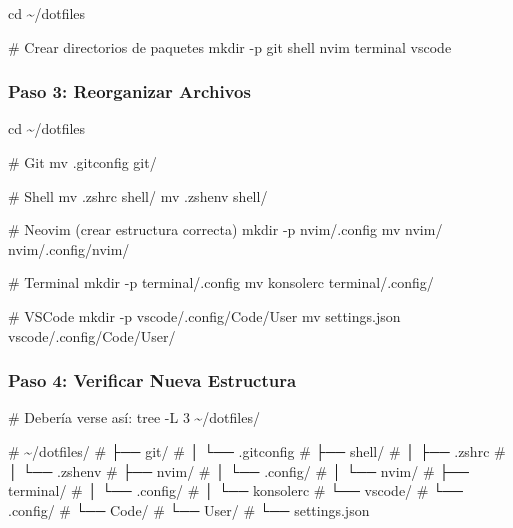 \documentclass[
  doc,
  floatsintext,
  longtable,
  a4paper,
  nolmodern,
  notxfonts,
  notimes,
  12pt,
  colorlinks=true,linkcolor=blue,citecolor=blue,urlcolor=blue]{apa7}
\newenvironment{Shaded}{\begin{snugshade}}{\end{snugshade}}
\newcommand{\AttributeTok}[1]{\textcolor[rgb]{0.40,0.45,0.13}{#1}}
\newcommand{\BuiltInTok}[1]{\textcolor[rgb]{0.00,0.23,0.31}{#1}}
\newcommand{\CommentTok}[1]{\textcolor[rgb]{0.37,0.37,0.37}{#1}}
\newcommand{\ExtensionTok}[1]{\textcolor[rgb]{0.00,0.23,0.31}{#1}}
\newcommand{\FunctionTok}[1]{\textcolor[rgb]{0.28,0.35,0.67}{#1}}
\newcommand{\NormalTok}[1]{\textcolor[rgb]{0.00,0.23,0.31}{#1}}
\begin{document}
\begin{Shaded}
\begin{Highlighting}[]
\BuiltInTok{cd}\NormalTok{ \textasciitilde{}/dotfiles}

\CommentTok{\# Crear directorios de paquetes}
\FunctionTok{mkdir} \AttributeTok{{-}p}\NormalTok{ git shell nvim terminal vscode}
\end{Highlighting}
\end{Shaded}

\subsubsection{Paso 3: Reorganizar
Archivos}\label{paso-3-reorganizar-archivos}

\begin{Shaded}
\begin{Highlighting}[]
\BuiltInTok{cd}\NormalTok{ \textasciitilde{}/dotfiles}

\CommentTok{\# Git}
\FunctionTok{mv}\NormalTok{ .gitconfig git/}

\CommentTok{\# Shell}
\FunctionTok{mv}\NormalTok{ .zshrc shell/}
\FunctionTok{mv}\NormalTok{ .zshenv shell/}

\CommentTok{\# Neovim (crear estructura correcta)}
\FunctionTok{mkdir} \AttributeTok{{-}p}\NormalTok{ nvim/.config}
\FunctionTok{mv}\NormalTok{ nvim/ nvim/.config/nvim/}

\CommentTok{\# Terminal}
\FunctionTok{mkdir} \AttributeTok{{-}p}\NormalTok{ terminal/.config}
\FunctionTok{mv}\NormalTok{ konsolerc terminal/.config/}

\CommentTok{\# VSCode}
\FunctionTok{mkdir} \AttributeTok{{-}p}\NormalTok{ vscode/.config/Code/User}
\FunctionTok{mv}\NormalTok{ settings.json vscode/.config/Code/User/}
\end{Highlighting}
\end{Shaded}

\subsubsection{Paso 4: Verificar Nueva
Estructura}\label{paso-4-verificar-nueva-estructura}

\begin{Shaded}
\begin{Highlighting}[]
\CommentTok{\# Debería verse así:}
\ExtensionTok{tree} \AttributeTok{{-}L}\NormalTok{ 3 \textasciitilde{}/dotfiles/}

\CommentTok{\# \textasciitilde{}/dotfiles/}
\CommentTok{\# ├── git/}
\CommentTok{\# │   └── .gitconfig}
\CommentTok{\# ├── shell/}
\CommentTok{\# │   ├── .zshrc}
\CommentTok{\# │   └── .zshenv}
\CommentTok{\# ├── nvim/}
\CommentTok{\# │   └── .config/}
\CommentTok{\# │       └── nvim/}
\CommentTok{\# ├── terminal/}
\CommentTok{\# │   └── .config/}
\CommentTok{\# │       └── konsolerc}
\CommentTok{\# └── vscode/}
\CommentTok{\#     └── .config/}
\CommentTok{\#         └── Code/}
\CommentTok{\#             └── User/}
\CommentTok{\#                 └── settings.json}
\end{Highlighting}
\end{Shaded}
\end{document}
